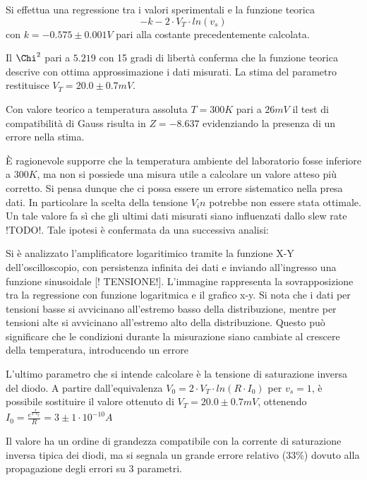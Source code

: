 \documentclass[journal]{IEEEtran}
\begin{document}
Si effettua una regressione tra i valori sperimentali e la funzione teorica 
\begin{equation}
-k - 2 \cdot V_T \cdot ln(v_s)
\end{equation}
con $k = -0.575 \pm 0.001 V$ pari alla costante precedentemente calcolata.

Il ${\Chi}^2$ pari a $5.219$ con 15 gradi di libertà conferma che la funzione teorica descrive con ottima approssimazione i dati misurati.
La stima del parametro restituisce $V_T = 20.0 \pm 0.7 mV$.

Con valore teorico a temperatura assoluta $T = 300K$ pari a $26 mV$ il test di compatibilità di Gauss risulta in $Z = -8.637$ evidenziando la presenza di un errore nella
stima.

È ragionevole supporre che la temperatura ambiente del laboratorio fosse inferiore a $300 K$, ma non si possiede una misura utile a calcolare un valore atteso più corretto.
Si pensa dunque che ci possa essere un errore sistematico nella presa dati. In particolare la scelta della tensione $V_in$ potrebbe non essere stata ottimale. Un tale valore
fa sì che gli ultimi dati misurati siano influenzati dallo slew rate !TODO!. Tale ipotesi è confermata da una successiva analisi:

Si è analizzato l'amplificatore logaritimico tramite la funzione X-Y dell'oscilloscopio, con persistenza infinita dei dati e inviando all'ingresso una funzione sinusoidale [!
TENSIONE!]. L'immagine rappresenta la sovrapposizione tra la regressione con funzione logaritmica e il grafico x-y. Si nota che i dati per tensioni basse si avvicinano
all'estremo basso della distribuzione, mentre per tensioni alte si avvicinano all'estremo alto della distribuzione. Questo può significare che le condizioni durante la
misurazione siano cambiate al crescere della temperatura, introducendo un errore

L'ultimo parametro che si intende calcolare è la tensione di saturazione inversa del diodo.
A partire dall'equivalenza $V_0 = 2 \cdot V_T \cdot ln(R \cdot I_0)$ per $v_s = 1$, è possibile sostituire il valore ottenuto di $V_T = 20.0 \pm 0.7 mV$, ottenendo
$I_0 = \frac{e^{\frac{k}{2 \cdot V_T}}}{R} = 3 \pm 1 \cdot 10^{-10} A$

Il valore ha un ordine di grandezza compatibile con la corrente di saturazione inversa tipica dei diodi, ma si segnala un grande errore relativo ($33 \% $) dovuto alla
propagazione degli errori su 3 parametri.

\end{document}
